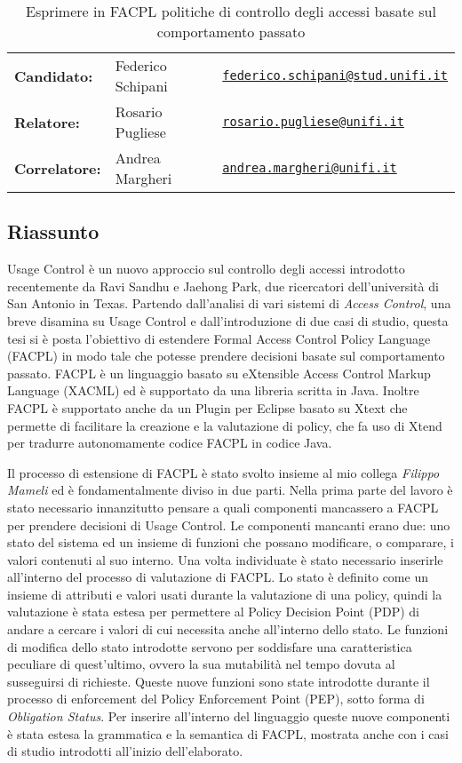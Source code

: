 \documentclass{article}
\begin{document}
\begin{table}[]
\centering
\caption*{Esprimere in FACPL politiche di controllo degli accessi basate sul comportamento passato}
\begin{tabular}{lll}
\textbf{Candidato:}   & Federico Schipani & \href{mailto:federico.schipani@stud.unifi.it}{\texttt{federico.schipani@stud.unifi.it}}  \\
\textbf{Relatore:}    & Rosario Pugliese  & \href{mailto:rosario.pugliese@unifi.it}{\texttt{rosario.pugliese@unifi.it}}                           \\
\textbf{Correlatore:} & Andrea Margheri   & \href{mailto:andrea.margheri@unifi.it}{\texttt{andrea.margheri@unifi.it}}                          
\end{tabular}
\end{table}
\subsection*{Riassunto}
Usage Control è un nuovo approccio sul controllo degli accessi introdotto recentemente da Ravi Sandhu e Jaehong Park, due ricercatori dell'università di San Antonio in Texas.
Partendo dall'analisi di vari sistemi di \textit{Access Control}, una breve disamina su Usage Control e dall'introduzione di due casi di studio, questa tesi si è posta l'obiettivo di estendere Formal Access Control Policy Language (FACPL) in modo tale che potesse prendere decisioni basate sul comportamento passato. FACPL è un linguaggio basato su eXtensible Access Control Markup Language (XACML) ed è supportato da una libreria scritta in Java. Inoltre FACPL è supportato anche da un Plugin per Eclipse basato su Xtext che permette di facilitare la creazione e la valutazione di policy, che fa uso di Xtend per tradurre autonomamente codice FACPL in codice Java. \par
Il processo di estensione di FACPL è stato svolto insieme al mio collega \textit{Filippo Mameli} ed è fondamentalmente diviso in due parti.
Nella prima parte del lavoro è stato necessario innanzitutto pensare a quali componenti mancassero a FACPL per prendere decisioni di Usage Control. Le componenti mancanti erano due: uno stato del sistema ed un insieme di funzioni che possano modificare, o comparare, i valori contenuti al suo interno. Una volta individuate è stato necessario inserirle all'interno del processo di valutazione di FACPL. Lo stato è definito come un insieme di attributi e valori usati durante la valutazione di una policy, quindi la valutazione è stata estesa per permettere al Policy Decision Point (PDP) di andare a cercare i valori di cui necessita anche all'interno dello stato. Le funzioni di modifica dello stato introdotte servono per soddisfare una caratteristica peculiare di quest'ultimo, ovvero la sua mutabilità nel tempo dovuta al susseguirsi di richieste. Queste nuove funzioni sono state introdotte durante il processo di enforcement del Policy Enforcement Point (PEP), sotto forma di \textit{Obligation Status}. Per inserire all'interno del linguaggio queste nuove componenti è stata estesa la grammatica e la semantica di FACPL, mostrata anche con i casi di studio introdotti all'inizio dell'elaborato.\par
\end{document}
